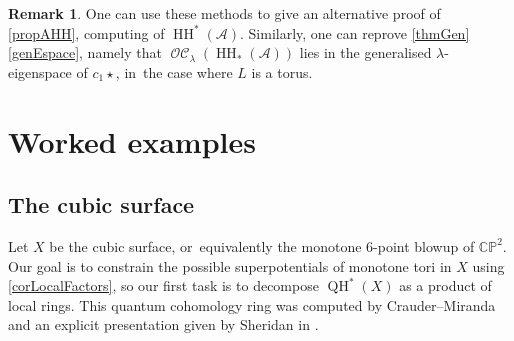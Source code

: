 \documentclass[JEP,XML,SOM,Unicode,NoEqCountersInSection,NoFloatCountersInSection,published]{cedram}
\theoremstyle{definition}
\newtheorem{remark}[theorem]{Remark}
\newcommand{\CC}{\mathbb{C}}
\newcommand{\PP}{\mathbb{P}}
\newcommand{\calA}{\mathcal{A}}
\newcommand{\HH}{\operatorname{HH}}
\newcommand{\OC}{\operatorname{\mathcal{OC}}}
\newcommand{\QH}{\operatorname{QH}}
\newcommand{\qprod}{\mathbin{\star}}
\begin{document}
\begin{remark}
One can use these methods to give an alternative proof of \cref{propAHH}, computing of $\HH^*(\calA)$. Similarly, one can reprove \cref{thmGen}\eqref{genEspace}, namely that $\OC_\lambda(\HH_*(\calA))$ lies in the generalised $\lambda$-eigenspace of $c_1 \qprod$, in~the case where $L$ is a torus.
\end{remark}

\section{Worked examples}
\label{secExamples}

\subsection{The cubic surface}
\label{exCubic}

Let $X$ be the cubic surface, or~equivalently the monotone $6$-point blowup of $\CC\PP^2$. Our goal is to constrain the possible superpotentials of monotone tori in $X$ using \cref{corLocalFactors}, so our first task is to decompose $\QH^*(X)$ as a product of local rings. This quantum cohomology ring was computed by Crauder--Miranda \cite{CrauderMiranda} and an explicit presentation given by Sheridan in \cite[Prop.\,B.1]{SheridanFano}.
\end{document}
